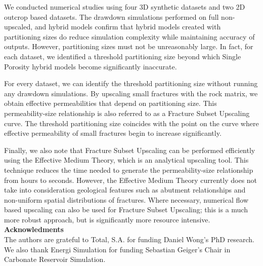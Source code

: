 \documentclass[a4paper]{article}
\begin{document}
We conducted numerical studies using four 3D synthetic datasets and two 2D outcrop based datasets. The drawdown simulations performed on full non-upscaled, and hybrid models confirm that hybrid models created with partitioning sizes do reduce simulation complexity while maintaining accuracy of outputs. However, partitioning sizes must not be unreasonably large. In fact, for each dataset, we identified a threshold partitioning size beyond which Single Porosity hybrid models become significantly inaccurate.

For every dataset, we can identify the threshold partitioning size without running any drawdown simulations. By upscaling small fractures with the rock matrix, we obtain effective permeabilities that depend on partitioning size. This permeability-size relationship is also referred to as a Fracture Subset Upscaling curve. The threshold partitioning size coincides with the point on the curve where effective permeability of small fractures begin to increase significantly. 

Finally, we also note that Fracture Subset Upscaling can be performed efficiently using the Effective Medium Theory, which is an analytical upscaling tool. This technique reduces the time needed to generate the permeability-size relationship from hours to seconds. However, the Effective Medium Theory currently does not take into consideration geological features such as abutment relationships and non-uniform spatial distributions of fractures. Where necessary, numerical flow based upscaling can also be used for Fracture Subset Upscaling; this is a much more robust approach, but is significantly more resource intensive.
\\

\textbf{Acknowledments}
\\
The authors are grateful to Total, S.A. for funding Daniel Wong's PhD research. We also thank Energi Simulation for funding Sebastian Geiger's Chair in Carbonate Reservoir Simulation. 



\end{document}
